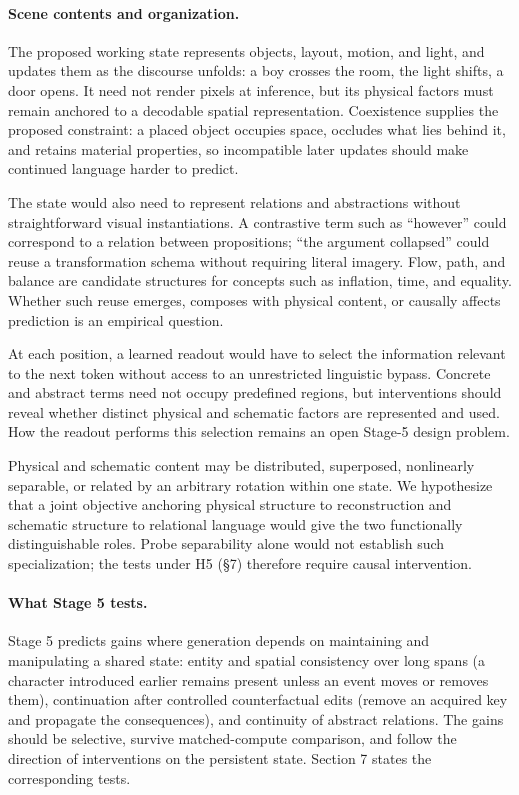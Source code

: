 \documentclass[11pt,a4paper]{article}
\begin{document}
\paragraph{Scene contents and organization.} The proposed working state represents objects, layout, motion, and light, and updates them as the discourse unfolds: a boy crosses the room, the light shifts, a door opens. It need not render pixels at inference, but its physical factors must remain anchored to a decodable spatial representation. Coexistence supplies the proposed constraint: a placed object occupies space, occludes what lies behind it, and retains material properties, so incompatible later updates should make continued language harder to predict.

The state would also need to represent relations and abstractions without straightforward visual instantiations. A contrastive term such as ``however'' could correspond to a relation between propositions; ``the argument collapsed'' could reuse a transformation schema without requiring literal imagery. Flow, path, and balance are candidate structures for concepts such as inflation, time, and equality. Whether such reuse emerges, composes with physical content, or causally affects prediction is an empirical question.

At each position, a learned readout would have to select the information relevant to the next token without access to an unrestricted linguistic bypass. Concrete and abstract terms need not occupy predefined regions, but interventions should reveal whether distinct physical and schematic factors are represented and used. How the readout performs this selection remains an open Stage-5 design problem.

Physical and schematic content may be distributed, superposed, nonlinearly separable, or related by an arbitrary rotation within one state. We hypothesize that a joint objective anchoring physical structure to reconstruction and schematic structure to relational language would give the two functionally distinguishable roles. Probe separability alone would not establish such specialization; the tests under H5 (§7) therefore require causal intervention.

\paragraph{What Stage 5 tests.} Stage 5 predicts gains where generation depends on maintaining and manipulating a shared state: entity and spatial consistency over long spans (a character introduced earlier remains present unless an event moves or removes them), continuation after controlled counterfactual edits (remove an acquired key and propagate the consequences), and continuity of abstract relations. The gains should be selective, survive matched-compute comparison, and follow the direction of interventions on the persistent state. Section 7 states the corresponding tests.
\end{document}
